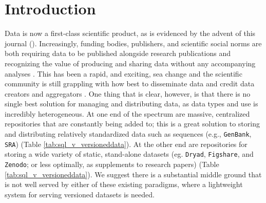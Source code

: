 \documentclass[a4paper,11pt]{article}
\begin{document}

\section{Introduction}

Data is now a first-class scientific product, as is evidenced by the advent of this journal (\cite{Editorial-2014}). Increasingly, funding bodies, publishers, and scientific social norms are both requiring data to be published alongside research publications and recognizing the value of producing and sharing data without any accompanying analyses \cite[e.g.][]{Whitlock-2011,Fairbairn-2011,Piwowar-2011,VanNoorden-2013,Gibney-2013}. This has been a rapid, and exciting, sea change and the scientific community is still grappling with how best to disseminate data and credit data creators and aggregators \cite{Whitlock-2011, Goodman-2014, Lowndes-2017,Perkel-2016,VanNoorden-2013, Kratz-2015}. One thing that is clear, however, is that there is no single best solution for managing and distributing data, as data types and use is incredibly heterogeneous. At one end of the spectrum are massive, centralized repositories that are constantly being added to; this is a great solution to storing and distributing relatively standardized data such as sequences (e.g., \texttt{GenBank}, \texttt{SRA}) (Table \ref{tab:sql_v_versioneddata}). At the other end are repositories for storing a wide variety of static, stand-alone datasets (eg. \texttt{Dryad}, \texttt{Figshare}, and \texttt{Zenodo}; or less optimally, as supplements to research papers) (Table \ref{tab:sql_v_versioneddata}). We suggest there is a substantial middle ground that is not well served by either of these existing paradigms, where a lightweight system for serving versioned datasets is needed.
\end{document}
